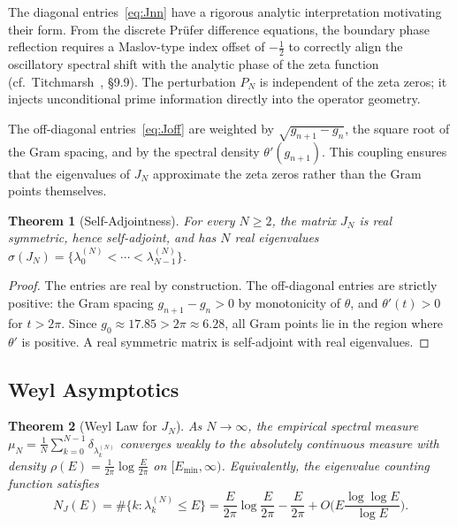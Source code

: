 \documentclass{pre-aomart}
\theoremstyle{plain}
\newtheorem{theorem}{Theorem}[section]
\theoremstyle{definition}
\theoremstyle{remark}
\begin{document}
The diagonal entries~\eqref{eq:Jnn} have a rigorous analytic interpretation motivating their form. From the discrete Pr\"ufer difference equations, the boundary phase reflection requires a Maslov-type index offset of $-\frac12$ to correctly align the oscillatory spectral shift with the analytic phase of the zeta function (cf.\ Titchmarsh~\cite{Titchmarsh1986}, \S9.9). The perturbation $P_N$ is independent of the zeta zeros; it injects unconditional prime information directly into the operator geometry.

The off-diagonal entries~\eqref{eq:Joff} are weighted by $\sqrt{g_{n+1} - g_n}$,
the square root of the Gram spacing, and by the spectral density
$\theta'(g_{n+1})$.  This coupling ensures that the eigenvalues of $J_N$
approximate the zeta zeros rather than the Gram points themselves.

\begin{theorem}[Self-Adjointness]\label{thm:sa_J}
For every $N \ge 2$, the matrix $J_N$ is real symmetric, hence
self-adjoint, and has $N$ real eigenvalues
$\sigma(J_N) = \{\lambda_0^{(N)} < \cdots < \lambda_{N-1}^{(N)}\}$.
\end{theorem}

\begin{proof}
The entries are real by construction.  The off-diagonal entries are
strictly positive: the Gram spacing $g_{n+1} - g_n > 0$ by
monotonicity of $\theta$, and $\theta'(t) > 0$ for $t > 2\pi$.
Since $g_0 \approx 17.85 > 2\pi \approx 6.28$, all Gram points
lie in the region where $\theta'$ is positive.
A real symmetric matrix is self-adjoint with real
eigenvalues.
\end{proof}

\subsection{Weyl Asymptotics}

\begin{theorem}[Weyl Law for $J_N$]\label{thm:weyl_J}
As $N \to \infty$, the empirical spectral measure
$\mu_N = \frac{1}{N}\sum_{k=0}^{N-1} \delta_{\lambda_k^{(N)}}$ converges
weakly to the absolutely continuous measure with density
$\rho(E) = \frac{1}{2\pi}\log\frac{E}{2\pi}$ on $[E_{\min}, \infty)$.
Equivalently, the eigenvalue counting function satisfies
\begin{equation}\label{eq:weyl_J}
N_J(E) = \#\{k : \lambda_k^{(N)} \le E\}
        = \frac{E}{2\pi}\log\frac{E}{2\pi} - \frac{E}{2\pi}
          + O\bigl(E\frac{\log\log E}{\log E}\bigr).
\end{equation}
\end{theorem}
\end{document}
